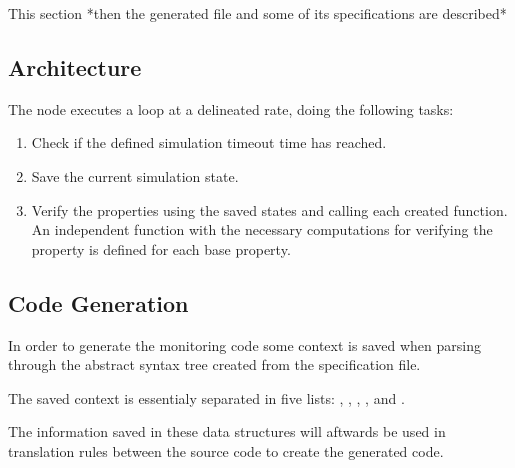 
This section *then the generated file and some of its specifications are described*

\subsection{Architecture}
\label{ssec:compileArchitecture}


The node executes a loop at a delineated rate, doing the following tasks:

\begin{enumerate}
    \item Check if the defined simulation timeout time has reached.
    \item Save the current simulation state.
    \item Verify the properties using the saved states and calling each created function. An independent function with the necessary computations for verifying the property is defined for each base property.
\end{enumerate}



\subsection{Code Generation}
\label{ssec:compileCtx}

In order to generate the monitoring code some context is saved when parsing through the abstract syntax tree created from the specification file.

The saved context is essentialy separated in five lists: , , , , and .

The information saved in these data structures will aftwards be used in translation rules between the source code to create the generated code.



